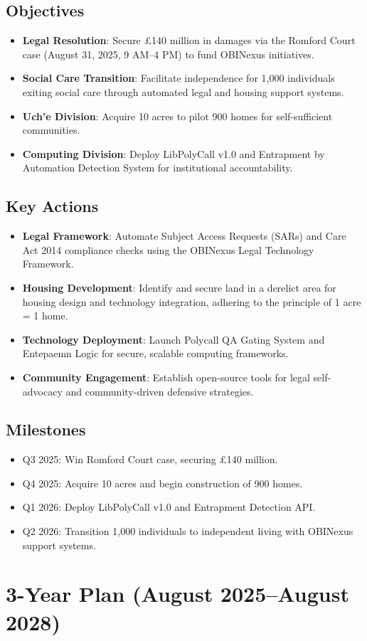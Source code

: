 \documentclass[12pt]{article}\usepackage[a4paper,margin=1in]{geometry}
\begin{document}
\subsection*{Objectives}
\begin{itemize}
    \item \textbf{Legal Resolution}: Secure £140 million in damages via the Romford Court case (August 31, 2025, 9 AM--4 PM) to fund OBINexus initiatives.
    \item \textbf{Social Care Transition}: Facilitate independence for 1,000 individuals exiting social care through automated legal and housing support systems.
    \item \textbf{Uch'e Division}: Acquire 10 acres to pilot 900 homes for self-sufficient communities.
    \item \textbf{Computing Division}: Deploy LibPolyCall v1.0 and Entrapment by Automation Detection System for institutional accountability.
\end{itemize}\subsection*{Key Actions}
\begin{itemize}
    \item \textbf{Legal Framework}: Automate Subject Access Requests (SARs) and Care Act 2014 compliance checks using the OBINexus Legal Technology Framework.
    \item \textbf{Housing Development}: Identify and secure land in a derelict area for housing design and technology integration, adhering to the principle of 1 acre = 1 home.
    \item \textbf{Technology Deployment}: Launch Polycall QA Gating System and Entepaemn Logic for secure, scalable computing frameworks.
    \item \textbf{Community Engagement}: Establish open-source tools for legal self-advocacy and community-driven defensive strategies.
\end{itemize}\subsection*{Milestones}
\begin{itemize}
    \item Q3 2025: Win Romford Court case, securing £140 million.
    \item Q4 2025: Acquire 10 acres and begin construction of 900 homes.
    \item Q1 2026: Deploy LibPolyCall v1.0 and Entrapment Detection API.
    \item Q2 2026: Transition 1,000 individuals to independent living with OBINexus support systems.
\end{itemize}\section*{3-Year Plan (August 2025--August 2028)}
\end{document}
